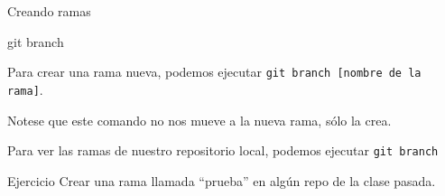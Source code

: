 \begin{frame}[t]{Creando ramas}
    \begin{comando}
        git branch
    \end{comando}

    \pause
    \begin{block}{}
        Para crear una rama nueva, podemos ejecutar \texttt{git branch [nombre de la rama]}.

        Notese que este comando no nos mueve a la nueva rama, sólo la crea.

        Para ver las ramas de nuestro repositorio local, podemos ejecutar \texttt{git branch}
    \end{block}

    \pause
    \begin{ejercicio}{Ejercicio}
        Crear una rama llamada ``prueba'' en algún repo de la clase pasada.
    \end{ejercicio}

\end{frame}

